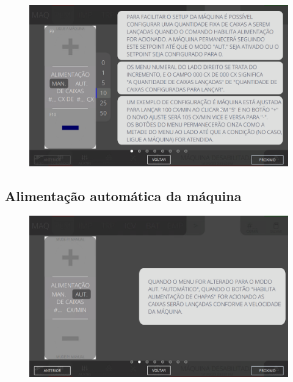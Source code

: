\begin{figure}
    \centering
    \includegraphics[width=576 px,height=360 px]{src/imagesICV/03-feeder/commands/2.png}
\end{figure}
\newpage
\thispagestyle{fancy}
\vspace{\fill}

\subsection{Alimentação automática da máquina}
\begin{figure}
    \centering
    \includegraphics[width=576 px,height=360 px]{src/imagesICV/03-feeder/commands/3.png}
\end{figure}
\newpage
\thispagestyle{fancy}
\vspace{\fill}

